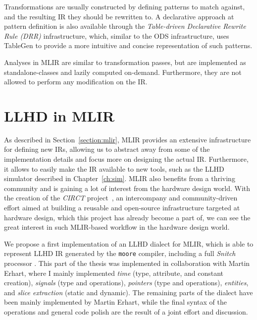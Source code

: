 Transformations are usually constructed by defining patterns to match against, and the resulting IR they should be rewritten to. A declarative approach at pattern definition is also available through the \textit{Table-driven Declarative Rewrite Rule (DRR)} infrastructure, which, similar to the ODS infrastructure, uses TableGen to provide a more intuitive and concise representation of such patterns.

Analyses in MLIR are similar to transformation passes, but are implemented as standalone-classes and lazily computed on-demand. Furthermore, they are not allowed to perform any modification on the IR.


\section{LLHD in MLIR}
\label{section:llhdmlir}
As described in Section~\ref{section:mlir}, MLIR provides an extensive infrastructure for defining new IRs, allowing us to abstract away from some of the implementation details and focus more on designing the actual IR. Furthermore, it allows to easily make the IR available to new tools, such as the LLHD simulator described in Chapter~\ref{ch:sim}. MLIR also benefits from a thriving community and is gaining a lot of interest from the hardware design world. With the creation of the \textit{CIRCT} project~\cite{circt}, an intercompany and community-driven effort aimed at building a reusable and open-source infrastructure targeted at hardware design, which this project has already become a part of, we can see the great interest in such MLIR-based workflow in the hardware design world.

We propose a first implementation of an LLHD dialect for MLIR, which is able to represent LLHD IR generated by the \texttt{moore} compiler, including a full \textit{Snitch} processor \cite{Zaruba2020}. This part of the thesis was implemented in collaboration with Martin Erhart, where I mainly implemented \textit{time} (type, attribute, and constant creation), \textit{signals} (type and operations), \textit{pointers} (type and operations), \textit{entities}, and \textit{slice extraction} (static and dynamic). The remaining parts of the dialect have been mainly implemented by Martin Erhart, while the final syntax of the operations and general code polish are the result of a joint effort and discussion.

